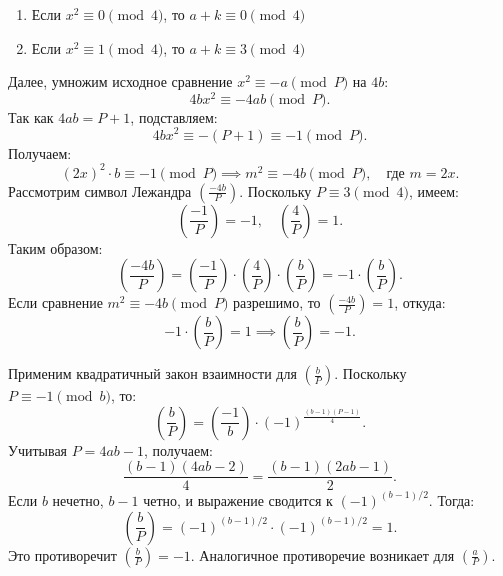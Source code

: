 \documentclass[a4paper]{article}
\begin{document}
\begin{enumerate}
    \begin{enumerate}
        \item[]Если \( x^2 \equiv 0 \pmod{4} \), то \( a + k \equiv 0 \pmod{4} \)
        \item[]Если \( x^2 \equiv 1 \pmod{4} \), то \( a + k \equiv 3 \pmod{4} \)
    \end{enumerate}    
    Далее, умножим исходное сравнение \( x^2 \equiv -a \pmod{P} \) на \( 4b \):
    \[
    4b x^2 \equiv -4ab \pmod{P}.
    \]
    Так как \( 4ab = P + 1 \), подставляем:
    \[
    4b x^2 \equiv -(P + 1) \equiv -1 \pmod{P}.
    \]
    Получаем:
    \[
    (2x)^2 \cdot b \equiv -1 \pmod{P} \implies m^2 \equiv -4b \pmod{P}, \quad \text{где } m = 2x.
    \]
    Рассмотрим символ Лежандра \( \left( \frac{-4b}{P} \right) \). Поскольку \( P \equiv 3 \pmod{4} \), имеем:
    \[
    \left( \frac{-1}{P} \right) = -1, \quad \left( \frac{4}{P} \right) = 1.
    \]
    Таким образом:
    \[
    \left( \frac{-4b}{P} \right) = \left( \frac{-1}{P} \right) \cdot \left( \frac{4}{P} \right) \cdot \left( \frac{b}{P} \right) = -1 \cdot \left( \frac{b}{P} \right).
    \]
    Если сравнение \( m^2 \equiv -4b \pmod{P} \) разрешимо, то \( \left( \frac{-4b}{P} \right) = 1 \), откуда:
    \[
    -1 \cdot \left( \frac{b}{P} \right) = 1 \implies \left( \frac{b}{P} \right) = -1.
    \]

    Применим квадратичный закон взаимности для \( \left( \frac{b}{P} \right) \). Поскольку \( P \equiv -1 \pmod{b} \), то:
    \[
    \left( \frac{b}{P} \right) = \left( \frac{-1}{b} \right) \cdot (-1)^{\frac{(b-1)(P-1)}{4}}.
    \]
    Учитывая \( P = 4ab - 1 \), получаем:
    \[
    \frac{(b-1)(4ab - 2)}{4} = \frac{(b-1)(2ab - 1)}{2}.
    \]
    Если \( b \) нечетно, \( b-1 \) четно, и выражение сводится к \( (-1)^{(b-1)/2} \). Тогда:
    \[
    \left( \frac{b}{P} \right) = (-1)^{(b-1)/2} \cdot (-1)^{(b-1)/2} = 1.
    \]
    Это противоречит \( \left( \frac{b}{P} \right) = -1 \). Аналогичное противоречие возникает для \( \left( \frac{a}{P} \right) \).

\end{enumerate}
\end{document}
